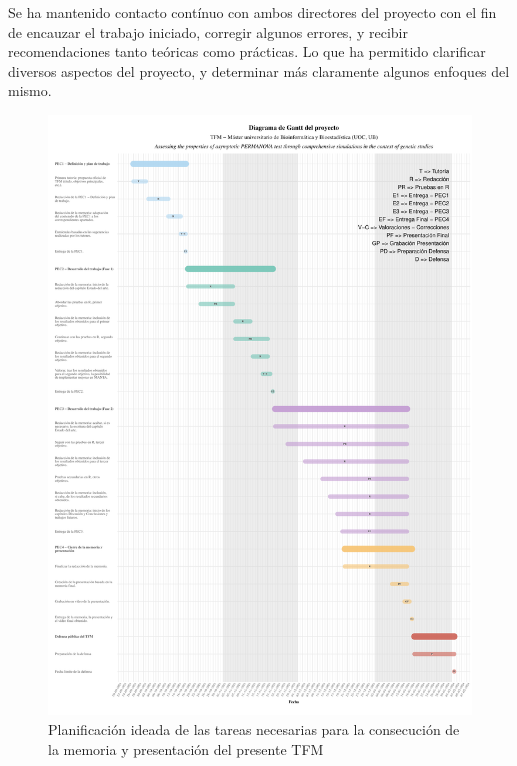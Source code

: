 \documentclass[IB,BIB]{TFUOC}%
\begin{document}
Se ha mantenido contacto contínuo con ambos directores del proyecto con el fin de encauzar el trabajo iniciado, corregir algunos errores, y recibir recomendaciones tanto teóricas como prácticas. Lo que ha permitido clarificar diversos aspectos del proyecto, y determinar más claramente algunos enfoques del mismo.

\newpage

\begin{figure}[!htbp]
    \centering
    \includegraphics[scale=.5]{TFMGantt.pdf}
    \caption{\scriptsize{Planificación ideada de las tareas necesarias para la consecución de la memoria y presentación del presente TFM}}
    \label{fig:PEC2 - GANTT_TFM}
\end{figure}


\newpage\null\thispagestyle{empty} %
\end{document}
